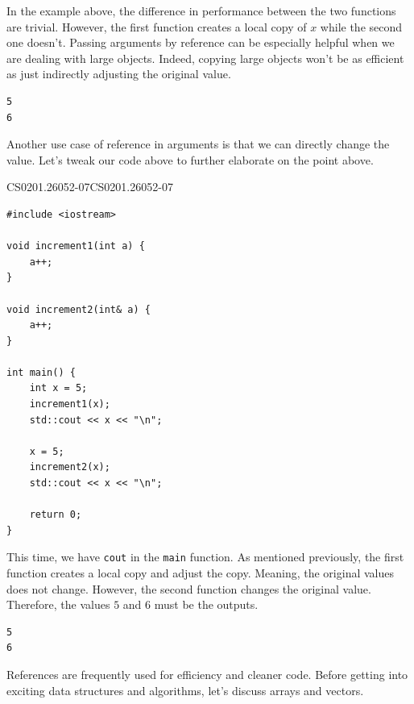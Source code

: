 \documentclass[../../main.tex]{subfiles}
\begin{document}
In the example above, the difference in performance between the
two functions are trivial. However, the first function creates
a local copy of $x$ while the second one doesn't. Passing arguments
by reference can be especially helpful when we are dealing with
large objects. Indeed, copying large objects won't be as efficient
as just indirectly adjusting the original value.

\begin{outputbox}
\begin{lstlisting}[style=basic]
5
6
\end{lstlisting}
\end{outputbox}

Another use case of reference in arguments is that we can directly
change the value. Let's tweak our code above to further elaborate
on the point above.

\begin{cppbox}{CS0201.26052-07}{CS0201.26052-07}
\begin{lstlisting}[style=cppstyle]
#include <iostream>

void increment1(int a) {
    a++;
}

void increment2(int& a) {
    a++;
}

int main() {
    int x = 5;
    increment1(x);
    std::cout << x << "\n";

    x = 5;
    increment2(x);
    std::cout << x << "\n";

    return 0;
}
\end{lstlisting}
\end{cppbox}

This time, we have \verb|cout| in the \verb|main| function. As
mentioned previously, the first function creates a local copy and
adjust the copy. Meaning, the original values does not change.
However, the second function changes the original value. Therefore,
the values $5$ and $6$ must be the outputs.

\begin{outputbox}
\begin{lstlisting}[style=basic]
5
6
\end{lstlisting}
\end{outputbox}

References are frequently used for efficiency and cleaner code.
Before getting into exciting data structures and algorithms,
let's discuss arrays and vectors.
\end{document}
